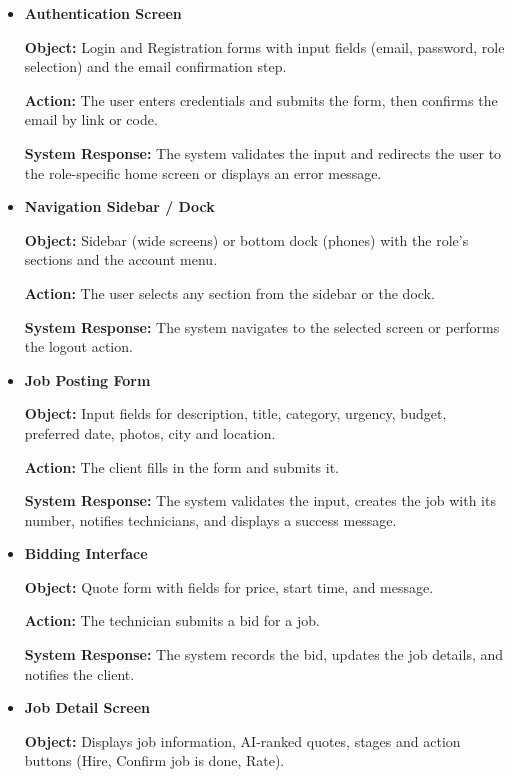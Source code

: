 \documentclass[A4paper,12pt]{report}
\theoremstyle{plain}
\theoremstyle{definition}
\theoremstyle{remark}
\numberwithin{equation}{section}
\begin{document}
\begin{itemize}

\item \textbf{Authentication Screen}  

\textbf{Object:} Login and Registration forms with input fields (email, password, role selection) and the email confirmation step.

\textbf{Action:} The user enters credentials and submits the form, then confirms the email by link or code.

\textbf{System Response:} The system validates the input and redirects the user to the role-specific home screen or displays an error message.

\item \textbf{Navigation Sidebar / Dock}

\textbf{Object:} Sidebar (wide screens) or bottom dock (phones) with the role's sections and the account menu.    

\textbf{Action:} The user selects any section from the sidebar or the dock.  

\textbf{System Response:} The system navigates to the selected screen or performs the logout action.

\item \textbf{Job Posting Form}  

\textbf{Object:} Input fields for description, title, category, urgency, budget, preferred date, photos, city and location.    

\textbf{Action:} The client fills in the form and submits it.  

\textbf{System Response:} The system validates the input, creates the job with its number, notifies technicians, and displays a success message.

\item \textbf{Bidding Interface}  

\textbf{Object:} Quote form with fields for price, start time, and message.    

\textbf{Action:} The technician submits a bid for a job.  

\textbf{System Response:} The system records the bid, updates the job details, and notifies the client.

\item \textbf{Job Detail Screen}  

\textbf{Object:} Displays job information, AI-ranked quotes, stages and action buttons (Hire, Confirm job is done, Rate).    


\end{itemize}
\end{document}
